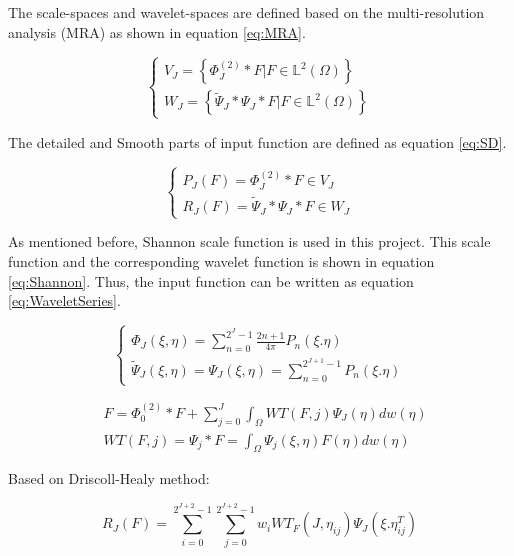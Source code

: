 \documentclass[12pt]{article}
\begin{document}
	The scale-spaces and wavelet-spaces are defined based on the multi-resolution analysis (MRA) as shown in equation \ref{eq:MRA}.
	
	\begin{equation}
		\begin{cases} 
			V_J = \left\{\Phi_J^{(2)}*F|F\in\mathbb{L}^2(\Omega)\right\} \\
			W_J = \left\{\tilde{\Psi}_J*\Psi_J*F|F\in\mathbb{L}^2(\Omega)\right\}
		\end{cases}
		\label{eq:MRA}
	\end{equation}
	
	The detailed and Smooth parts of input function are defined as equation \ref{eq:SD}.
	
	\begin{equation}
		\begin{cases} 
			P_J(F) = \Phi_J^{(2)}*F \in V_J \\
			R_J(F) = \tilde{\Psi}_J*\Psi_J*F \in W_J
		\end{cases}
		\label{eq:SD}
	\end{equation}
	
	As mentioned before, Shannon scale function is used in this project. This scale function and the corresponding wavelet function is shown in equation \ref{eq:Shannon}. Thus, the input function can be written as equation \ref{eq:WaveletSeries}.
	
	\begin{equation}
		\begin{cases} 
			\Phi_J(\xi,\eta) = \displaystyle \sum_{n=0}^{2^J-1} \frac{2n+1}{4\pi}P_n(\xi.\eta) \\
			\tilde{\Psi}_J(\xi,\eta)=\Psi_J(\xi,\eta) = \displaystyle \sum_{n=0}^{2^{J+1}-1} P_n(\xi.\eta)
		\end{cases}
		\label{eq:Shannon}
	\end{equation} 
	
	\begin{equation}
		\begin{split}
			&F = \Phi_0^{(2)}*F + \displaystyle \sum_{j=0}^{J} \int_{\Omega}WT(F,j)\Psi_J(\eta)dw(\eta) \\
			&WT(F,j) = \Psi_j * F = \int_{\Omega}\Psi_j(\xi,\eta)F(\eta)dw(\eta)
			\label{eq:WaveletSeries} 
		\end{split}
	\end{equation}
	
	Based on Driscoll-Healy method:
	
	\begin{equation}
		R_J(F) = \displaystyle \sum_{i=0}^{2^{J+2}-1} \sum_{j=0}^{2^{J+2}-1} w_iWT_F(J,\eta_{ij})\Psi_J(\xi.\eta_{ij}^T)
	\end{equation}
	
\end{document}
